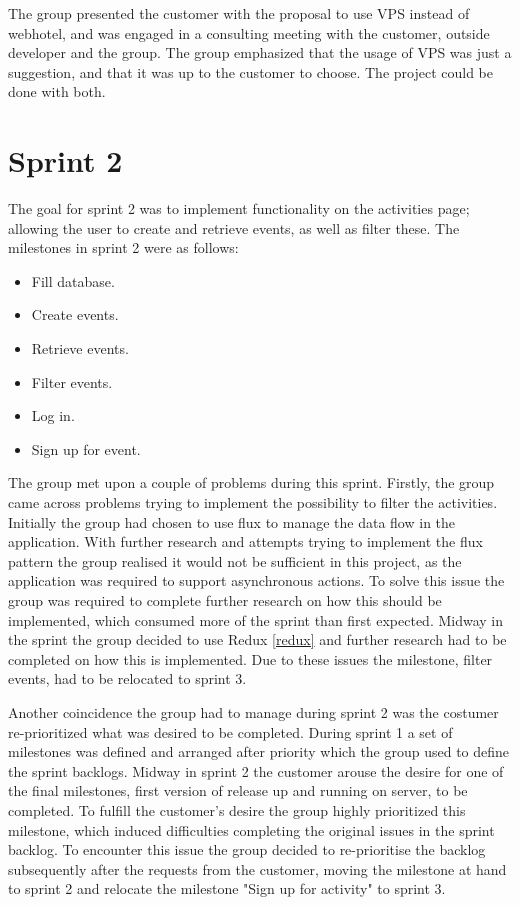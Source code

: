 The group presented the customer with the proposal to use VPS instead of webhotel, and was engaged in a consulting meeting with the customer, outside developer and the group. The group emphasized that the usage of VPS was just a suggestion, and that it was up to the customer to choose. The project could be done with both.  

\section{Sprint 2}
The goal for sprint 2 was to implement functionality on the activities page; allowing the user to create and retrieve events, as well as filter these. The milestones in sprint 2 were as follows:

\begin{itemize}
  \item Fill database.
  \item Create events.
  \item Retrieve events.
  \item Filter events.
  \item Log in.
  \item Sign up for event.
\end{itemize}

The group met upon a couple of problems during this sprint. Firstly, the group came across problems trying to implement the possibility to filter the activities. Initially the group had chosen to use flux to manage the data flow in the application. With further research and attempts trying to implement the flux pattern the group realised it would not be sufficient in this project, as the application was required to support asynchronous actions. To solve this issue the group was required to complete further research on how this should be implemented, which consumed more of the sprint than first expected. Midway in the sprint the group decided to use Redux \ref{redux} and further research had to be completed on how this is implemented. Due to these issues the milestone, filter events, had to be relocated to sprint 3. 

Another coincidence the group had to manage during sprint 2 was the costumer re-prioritized what was desired to be completed. During sprint 1 a set of milestones was defined and arranged after priority which the group used to define the sprint backlogs. Midway in sprint 2 the customer arouse the desire for one of the final milestones, first version of release up and running on server, to be completed. To fulfill the customer's desire the group highly prioritized this milestone, which induced difficulties completing the original issues in the sprint backlog. To encounter this issue the group decided to re-prioritise the backlog subsequently after the requests from the customer, moving the milestone at hand to sprint 2 and relocate the milestone "Sign up for activity" to sprint 3. 


